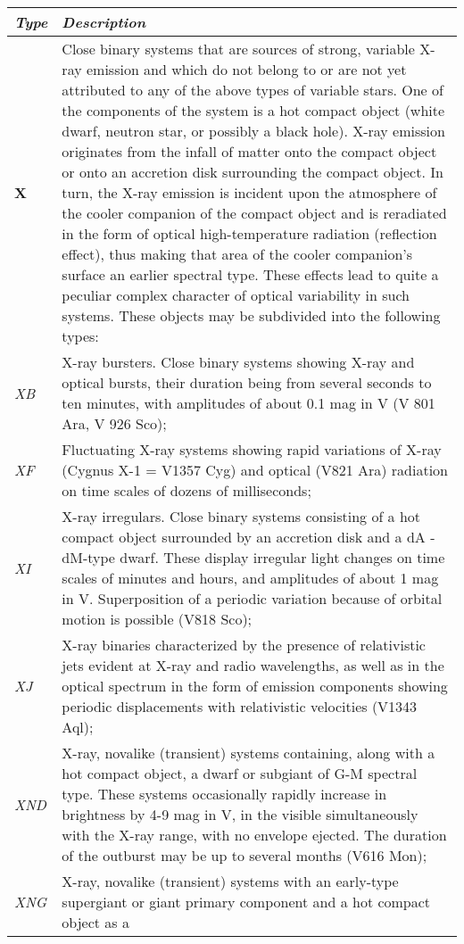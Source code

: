 \begin{longtabu} to \textwidth {l|X}
\toprule
\emph{Type} & \emph{Description}\tabularnewline
\midrule
\textbf{X} & Close binary systems that are sources of strong, variable
X-ray emission and which do not belong to or are not yet attributed to
any of the above types of variable stars. One of the components of the
system is a hot compact object (white dwarf, neutron star, or possibly a
black hole). X-ray emission originates from the infall of matter onto
the compact object or onto an accretion disk surrounding the compact
object. In turn, the X-ray emission is incident upon the atmosphere of
the cooler companion of the compact object and is reradiated in the form
of optical high-temperature radiation (reflection effect), thus making
that area of the cooler companion's surface an earlier spectral type.
These effects lead to quite a peculiar complex character of optical
variability in such systems. These objects may be subdivided into the
following types:\tabularnewline
\midrule
\emph{XB} & X-ray bursters. Close binary systems showing X-ray and
optical bursts, their duration being from several seconds to ten
minutes, with amplitudes of about 0.1 mag in V (V 801 Ara, V 926
Sco);\tabularnewline
\midrule
\emph{XF} & Fluctuating X-ray systems showing rapid variations of X-ray
(Cygnus X-1 = V1357 Cyg) and optical (V821 Ara) radiation on time scales
of dozens of milliseconds;\tabularnewline
\midrule
\emph{XI} & X-ray irregulars. Close binary systems consisting of a hot
compact object surrounded by an accretion disk and a dA - dM-type dwarf.
These display irregular light changes on time scales of minutes and
hours, and amplitudes of about 1 mag in V. Superposition of a periodic
variation because of orbital motion is possible (V818
Sco);\tabularnewline
\midrule
\emph{XJ} & X-ray binaries characterized by the presence of relativistic
jets evident at X-ray and radio wavelengths, as well as in the optical
spectrum in the form of emission components showing periodic
displacements with relativistic velocities (V1343 Aql);\tabularnewline
\midrule
\emph{XND} & X-ray, novalike (transient) systems containing, along with
a hot compact object, a dwarf or subgiant of G-M spectral type. These
systems occasionally rapidly increase in brightness by 4-9 mag in V, in
the visible simultaneously with the X-ray range, with no envelope
ejected. The duration of the outburst may be up to several months (V616
Mon);\tabularnewline
\midrule
\emph{XNG} & X-ray, novalike (transient) systems with an early-type
supergiant or giant primary component and a hot compact object as a

\end{longtabu}
